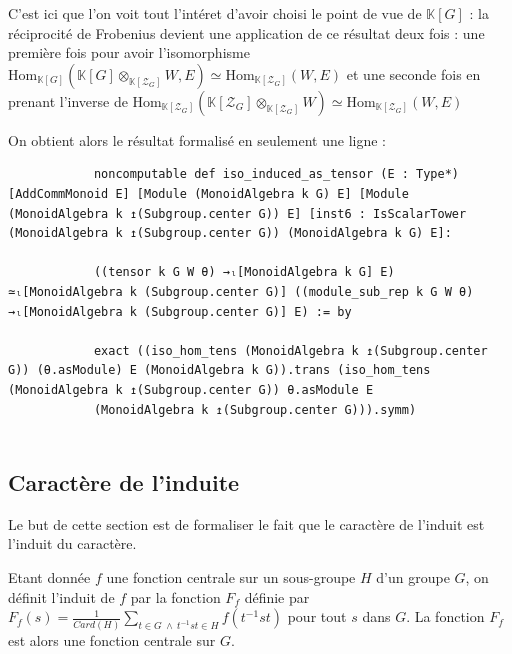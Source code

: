 \documentclass[10pt]{article}
\theoremstyle{definition}
\begin{document}
C'est ici que l'on voit tout l'intéret d'avoir choisi le point de vue de $\mathbb{K}[G]$ : la réciprocité de Frobenius devient une application de ce résultat deux fois : une première fois pour avoir l'isomorphisme $\text{Hom}_{\mathbb{K}[G]}(\mathbb{K}[G]\otimes_{\mathbb{K}[\mathcal{Z}_G]}W,E)\simeq\text{Hom}_{\mathbb{K}[\mathcal{Z}_G]}(W,E)$ et une seconde fois en prenant l'inverse de $\text{Hom}_{\mathbb{K}[\mathcal{Z}_G]}(\mathbb{K}[\mathcal{Z}_G]\otimes_{\mathbb{K}[\mathcal{Z}_G]} W)\simeq \text{Hom}_{\mathbb{K}[\mathcal{Z}_G]}(W,E)$
\newline

On obtient alors le résultat formalisé en seulement une ligne : 
\begin{center}
	\begin{tcolorbox}[title = $L\exists\forall N$,width=12cm,text width=12cm,colback=lightgray!30,
		colframe=gray,sharp corners,
		rounded corners=uphill ]
		\begin{lstlisting}
			noncomputable def iso_induced_as_tensor (E : Type*) [AddCommMonoid E] [Module (MonoidAlgebra k G) E] [Module (MonoidAlgebra k ↥(Subgroup.center G)) E] [inst6 : IsScalarTower (MonoidAlgebra k ↥(Subgroup.center G)) (MonoidAlgebra k G) E]:
			
			((tensor k G W θ) →ₗ[MonoidAlgebra k G] E) ≃ₗ[MonoidAlgebra k (Subgroup.center G)] ((module_sub_rep k G W θ) →ₗ[MonoidAlgebra k (Subgroup.center G)] E) := by
			
			exact ((iso_hom_tens (MonoidAlgebra k ↥(Subgroup.center G)) (θ.asModule) E (MonoidAlgebra k G)).trans (iso_hom_tens (MonoidAlgebra k ↥(Subgroup.center G)) θ.asModule E
			(MonoidAlgebra k ↥(Subgroup.center G))).symm)
			
		\end{lstlisting}
	\end{tcolorbox}
\end{center}
 
 
\subsection{Caractère de l'induite}
Le but de cette section est de formaliser le fait que \og le caractère de l'induit est l'induit du caractère\fg.
\newline

Etant donnée $f$ une fonction centrale sur un sous-groupe $H$ d'un groupe $G$, on définit l'induit de $f$ par la fonction $F_f$ définie par $F_f(s)=\frac{1}{Card(H)}\sum\limits_{t\in G \ \wedge \ t^{-1}st\in H}f(t^{-1}st)$ pour tout $s$ dans $G$. La fonction $F_f$ est alors une fonction centrale sur $G$.
\newline
\end{document}
